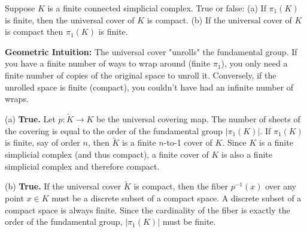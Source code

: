 \begin{exercise}
\label{geometry:2011:7}
Suppose $K$ is a finite connected simplicial complex. True or false:
(a) If $\pi_{1}(K)$ is finite, then the universal cover of $K$ is compact.
(b) If the universal cover of $K$ is compact then $\pi_{1}(K)$ is finite.
\end{exercise}

\begin{solution}
\textbf{Geometric Intuition:} The universal cover "unrolls" the fundamental group. If you have a finite number of ways to wrap around (finite $\pi_1$), you only need a finite number of copies of the original space to unroll it. Conversely, if the unrolled space is finite (compact), you couldn't have had an infinite number of wraps.

(a) \textbf{True.} Let $p : \tilde{K} \to K$ be the universal covering map. The number of sheets of the covering is equal to the order of the fundamental group $|\pi_1(K)|$. If $\pi_1(K)$ is finite, say of order $n$, then $\tilde{K}$ is a finite $n$-to-1 cover of $K$. Since $K$ is a finite simplicial complex (and thus compact), a finite cover of $K$ is also a finite simplicial complex and therefore compact.

(b) \textbf{True.} If the universal cover $\tilde{K}$ is compact, then the fiber $p^{-1}(x)$ over any point $x \in K$ must be a discrete subset of a compact space. A discrete subset of a compact space is always finite. Since the cardinality of the fiber is exactly the order of the fundamental group, $|\pi_1(K)|$ must be finite.
\end{solution}

